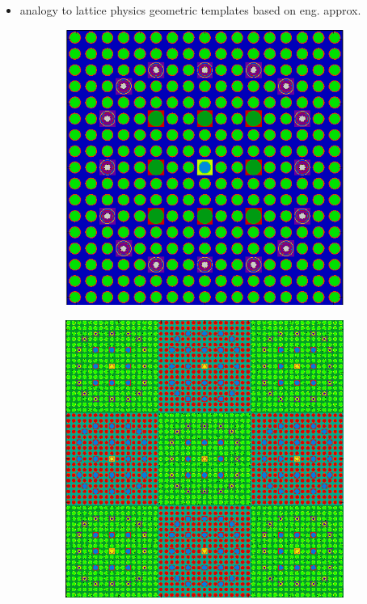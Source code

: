 \begin{itemize}[noitemsep]
  \item analogy to lattice physics geometric templates based on eng. approx.
\end{itemize}

\begin{figure}
\begin{subfigure}{.5\textwidth}
  \centering
  \includegraphics[width=.7\linewidth]{figures/workflow/opencg/cells-xy-24-16-assm}
  \caption{}
  \label{fig:assm-cells}
\end{subfigure}%
\begin{subfigure}{.5\textwidth}
  \centering
  \includegraphics[width=.7\linewidth]{figures/workflow/opencg/cells-xy-colorset}
  \caption{}
  \label{fig:colorset-cells}
\end{subfigure}

\end{figure}
